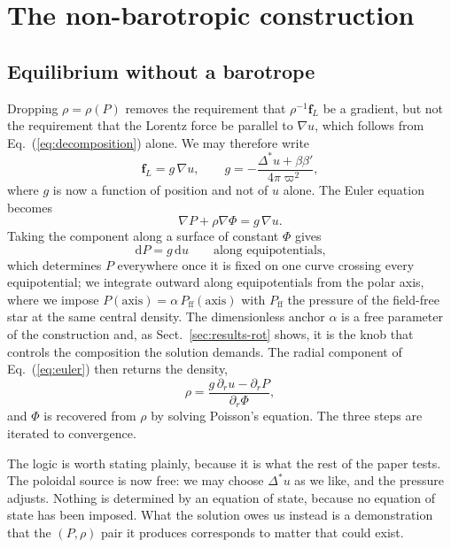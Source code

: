 \documentclass{aa}
\begin{document}

\section{The non-barotropic construction}
\label{sec:nonbarotropic}

\subsection{Equilibrium without a barotrope}

Dropping $\rho = \rho(P)$ removes the requirement that
$\rho^{-1}\mathbf{f}_L$ be a gradient, but not the requirement that the
Lorentz force be parallel to $\nabla u$, which follows from
Eq.~(\ref{eq:decomposition}) alone. We may therefore write
\begin{equation}
\mathbf{f}_L = g\,\nabla u ,
\qquad
g = -\frac{\Delta^\ast u + \beta\beta'}{4\pi\varpi^2} ,
\label{eq:fl}
\end{equation}
where $g$ is now a function of position and not of $u$ alone. The Euler
equation becomes
\begin{equation}
\nabla P + \rho\nabla\Phi = g\,\nabla u .
\label{eq:euler}
\end{equation}
Taking the component along a surface of constant $\Phi$ gives
\begin{equation}
\mathrm{d}P = g\,\mathrm{d}u
\qquad\text{along equipotentials,}
\label{eq:dPdu}
\end{equation}
which determines $P$ everywhere once it is fixed on one curve crossing
every equipotential; we integrate outward along equipotentials from the
polar axis, where we impose
$P(\text{axis}) = \alpha\,P_{\mathrm{ff}}(\text{axis})$ with
$P_{\mathrm{ff}}$ the pressure of the field-free star at the same central
density. The dimensionless anchor $\alpha$ is a free parameter of the
construction and, as Sect.~\ref{sec:results-rot} shows, it is the knob
that controls the composition the solution demands. The radial component
of Eq.~(\ref{eq:euler}) then returns the density,
\begin{equation}
\rho = \frac{g\,\partial_r u - \partial_r P}{\partial_r \Phi} ,
\label{eq:rhoinv}
\end{equation}
and $\Phi$ is recovered from $\rho$ by solving Poisson's equation. The
three steps are iterated to convergence.

The logic is worth stating plainly, because it is what the rest of the
paper tests. The poloidal source is now free: we may choose
$\Delta^\ast u$ as we like, and the pressure adjusts. Nothing is
determined by an equation of state, because no equation of state has been
imposed. What the solution owes us instead is a demonstration that the
$(P,\rho)$ pair it produces corresponds to matter that could exist.
\end{document}
